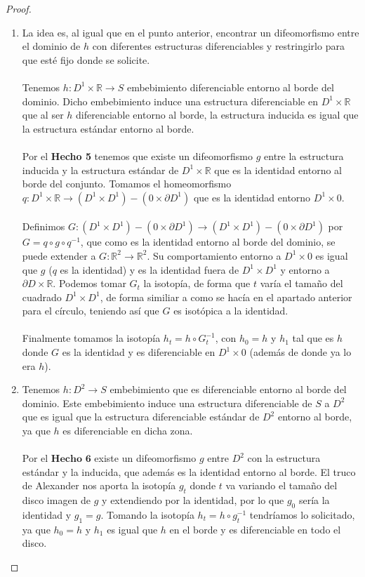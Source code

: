 \begin{proof}
\begin{enumerate}
			\item La idea es, al igual que en el punto anterior, encontrar un difeomorfismo entre el dominio de $h$ con diferentes estructuras diferenciables y restringirlo para que esté fijo donde se solicite.\\
				\\ Tenemos $h: D^1\times \mathbb{R} \rightarrow S$ embebimiento diferenciable entorno al borde del dominio. Dicho embebimiento induce una estructura diferenciable en $D^1\times \mathbb{R}$ que al ser $h$ diferenciable entorno al borde, la estructura inducida es igual que la estructura estándar entorno al borde.\\
				\\ Por el \textbf{Hecho 5} tenemos que existe un difeomorfismo $g$ entre la estructura inducida y la estructura estándar de $D^1\times \mathbb{R}$ que es la identidad entorno al borde del conjunto. Tomamos el homeomorfismo $q: D^1\times \mathbb{R} \rightarrow (D^1\times D^1) - (0 \times \partial D^1)$ que es la identidad entorno $D^1\times 0$.\\
				\\ Definimos $G:  (D^1\times D^1) - (0 \times \partial D^1) \rightarrow (D^1\times D^1) - (0 \times \partial D^1)$ por $G = q \circ g \circ q^{-1}$, que como es la identidad entorno al borde del dominio, se puede extender a $G:\mathbb{R}^2 \rightarrow \mathbb{R}^2$. Su comportamiento entorno a $D^1 \times 0$ es igual que $g$ ($q$ es la identidad) y es la identidad fuera de $D^1 \times D^1$ y entorno a $\partial D \times \mathbb{R}$. Podemos tomar $G_t$ la isotopía, de forma que $t$ varía el tamaño del cuadrado $D^1 \times D^1$, de forma similiar a como se hacía en el apartado anterior para el círculo, teniendo así que $G$ es isotópica a la identidad.\\
				\\ Finalmente tomamos la isotopía $h_t = h \circ G_t^{-1}$, con $h_0 = h$ y $h_1$ tal que es $h$ donde $G$ es la identidad y es diferenciable en $D^1 \times 0$ (además de donde ya lo era $h$).
			\item Tenemos $h: D^2 \rightarrow S$ embebimiento que es diferenciable entorno al borde del dominio. Este embebimiento induce una estructura diferenciable de $S$ a $D^2$ que es igual que la estructura diferenciable estándar de $D^2$ entorno al borde, ya que $h$ es diferenciable en dicha zona.\\
				\\ Por el $\textbf{Hecho 6}$ existe un difeomorfismo $g$ entre $D^2$ con la estructura estándar y la inducida, que además es la identidad entorno al borde. El truco de Alexander nos aporta la isotopía $g_t$ donde $t$ va variando el tamaño del disco imagen de $g$ y extendiendo por la identidad, por lo que $g_0$ sería la identidad y $g_1 = g$. Tomando la isotopía $h_t = h \circ g_t^{-1}$ tendríamos lo solicitado, ya que $h_0 = h$ y $h_1$ es igual que $h$ en el borde y es diferenciable en todo el disco.
		\end{enumerate}
		
	\end{proof}
